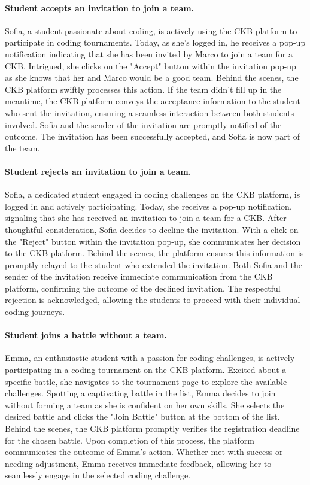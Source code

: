 \paragraph*{Student accepts an invitation to join a team.}
Sofia, a student passionate about coding, is actively using the CKB platform to participate in coding tournaments. 
Today, as she's logged in, he receives a pop-up notification indicating that she has been invited by Marco to join a team for a CKB.
Intrigued, she clicks on the "Accept" button within the invitation pop-up as she knows that her and Marco would be a good team. 
Behind the scenes, the CKB platform swiftly processes this action.
If the team didn't fill up in the meantime, the CKB platform conveys the acceptance information to the student who sent the invitation, ensuring a seamless interaction between both students involved.
Sofia and the sender of the invitation are promptly notified of the outcome. 
The invitation has been successfully accepted, and Sofia is now part of the team.


\paragraph*{Student rejects an invitation to join a team.}
Sofia, a dedicated student engaged in coding challenges on the CKB platform, is logged in and actively participating. 
Today, she receives a pop-up notification, signaling that she has received an invitation to join a team for a CKB.
After thoughtful consideration, Sofia decides to decline the invitation. 
With a click on the "Reject" button within the invitation pop-up, she communicates her decision to the CKB platform. 
Behind the scenes, the platform ensures this information is promptly relayed to the student who extended the invitation.
Both Sofia and the sender of the invitation receive immediate communication from the CKB platform, confirming the outcome of the declined invitation. 
The respectful rejection is acknowledged, allowing the students to proceed with their individual coding journeys.


\paragraph*{Student joins a battle without a team.}
Emma, an enthusiastic student with a passion for coding challenges, is actively participating in a coding tournament on the CKB platform. 
Excited about a specific battle, she navigates to the tournament page to explore the available challenges.
Spotting a captivating battle in the list, Emma decides to join without forming a team as she is confident on her own skills. 
She selects the desired battle and clicks the "Join Battle" button at the bottom of the list.
Behind the scenes, the CKB platform promptly verifies the registration deadline for the chosen battle. 
Upon completion of this process, the platform communicates the outcome of Emma's action. 
Whether met with success or needing adjustment, Emma receives immediate feedback, allowing her to seamlessly engage in the selected coding challenge.


